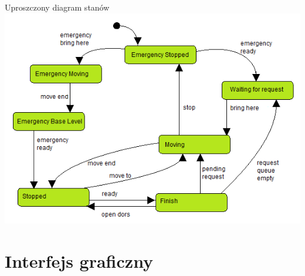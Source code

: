 \documentclass[a4paper,11pt]{article}
\begin{document}
Uproszczony diagram stanów \\
\includegraphics{images/simplifiedStateChart.png}
\section{Interfejs graficzny}
\end{document}
